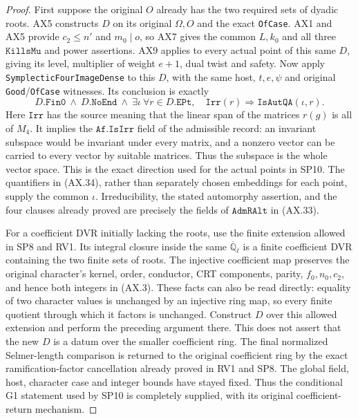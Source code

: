 \begin{proof}
First suppose the original $O$ already has the two required
sets of dyadic roots.  AX5 constructs $D$ on its original
$\Omega,O$ and the exact \texttt{OfCase}.  AX1 and AX5 provide
$c_2\le n'$ and $m_0\mid o$, so AX7 gives the common $L,k_0$
and all three $\mathtt{KillsMu}$ and power assertions.
AX9 applies to every actual point of this same $D$, giving
its level, multiplier of weight $e+1$, dual twist and safety.
Now apply \texttt{SymplecticFourImageDense} to this $D$, with
the same host, $t,e,\psi$ and original \texttt{Good}/\texttt{OfCase}
witnesses.  Its conclusion is exactly
\[
 D.\mathtt{Fin0}\ \wedge\ D.\mathtt{NoEnd}\ \wedge\
 \exists\iota\ \forall r\in D.\mathtt{EPt},\quad
 \mathtt{Irr}(r)\Longrightarrow\mathtt{IsAutQA}(\iota,r).
 \tag{AX.34}
\]
Here $\mathtt{Irr}$ has the source meaning that the linear span
of the matrices $r(g)$ is all of $M_4$.  It implies the
$\mathtt{Af.IsIrr}$ field of the admissible record: an invariant
subspace would be invariant under every matrix, and a nonzero
vector can be carried to every vector by suitable matrices.
Thus the subspace is the whole vector space.  This is the exact
direction used for the actual points in SP10.
The quantifiers in (AX.34), rather than separately chosen
embeddings for each point, supply the common $\iota$.
Irreducibility, the stated automorphy assertion, and the four
clauses already proved are precisely the fields of
$\mathtt{AdmRAlt}$ in (AX.33).

For a coefficient DVR initially lacking the roots, use the
finite extension allowed in SP8 and RV1.  Its integral closure
inside the same $\overline{\mathbb Q}_\ell$ is a finite
coefficient DVR containing the two finite sets of roots.
The injective coefficient map preserves the original
character's kernel, order, conductor, CRT components, parity,
$f_0,n_0,c_2$, and hence both integers in (AX.3).
These facts can also be read directly: equality of two
character values is unchanged by an injective ring map,
so every finite quotient through which it factors is unchanged.
Construct $D$ over this allowed extension and perform the
preceding argument there.  This does not assert that the
new $D$ is a datum over the smaller coefficient ring.
The final normalized Selmer-length comparison is returned to
the original coefficient ring by the exact ramification-factor
cancellation already proved in RV1 and SP8.  The global field,
host, character case and integer bounds have stayed fixed.
Thus the conditional G1 statement used by SP10 is completely
supplied, with its original coefficient-return mechanism.
\end{proof}


